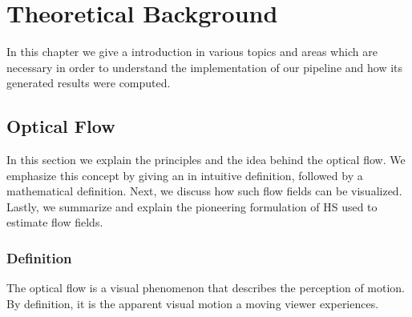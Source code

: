 \chapter{Theoretical Background}
In this chapter we give a introduction in various topics and areas which are necessary in order to understand the implementation of our pipeline and how its generated results were computed. 

\section{Optical Flow}
\label{sec:optical_flow}
In this section we explain the principles and the idea behind the optical flow. We emphasize this concept by giving an in intuitive definition, followed by a mathematical definition. Next, we discuss how such flow fields can be visualized. Lastly, we summarize and explain the pioneering formulation of HS used to estimate flow fields.

\subsection{Definition}

The optical flow is a visual phenomenon that describes the perception of motion.
By definition, it is the apparent visual motion a moving viewer experiences.

